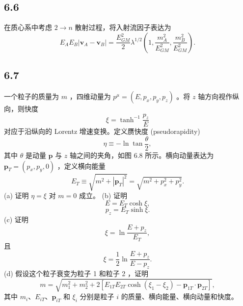 \newpage
\subsection{6.6}
在质心系中考虑 $2 \rightarrow n$ 散射过程，将入射流因子表达为
$$ E_A E_B |\mathbf{v}_A - \mathbf{v}_B| = \frac{E_{GM}^2}{2} \lambda^{1/2} \left( 1, \frac{m_A^2}{E_{GM}^2}, \frac{m_B^2}{E_{GM}^2} \right). \tag{6.420} $$

\newpage
\subsection{6.7}
一个粒子的质量为 $m$ ，四维动量为 $p^\mu = (E, p_x, p_y, p_z)$ 。将 $z$ 轴方向视作纵向，则快度
$$ \xi = \tanh^{-1} \frac{p_z}{E} \tag{6.421} $$
对应于沿纵向的 Lorentz 增速变换。定义赝快度 (pseudorapidity)
$$ \eta \equiv -\ln \tan \frac{\theta}{2}, \tag{6.422} $$
其中 $\theta$ 是动量 $\mathbf{p}$ 与 $z$ 轴之间的夹角，如图 6.8 所示。横向动量表达为 $\mathbf{p}_T = (p_x, p_y, 0)$ ，定义横向能量
$$ E_T \equiv \sqrt{m^2 + |\mathbf{p}_T|^2} = \sqrt{m^2 + p_x^2 + p_y^2}. \tag{6.423} $$
(a) 证明 $\eta = \xi$ 对 $m = 0$ 成立。
(b) 证明
$$ E = E_T \cosh \xi, $$
$$ p_z = E_T \sinh \xi. \tag{6.424} $$
(c) 证明
$$ \xi = \ln \frac{E + p_z}{E_T}, \tag{6.425} $$
且
$$ \xi = \frac{1}{2} \ln \frac{E + p_z}{E - p_z}. \tag{6.426} $$
(d) 假设这个粒子衰变为粒子 1 和粒子 2 ，证明
$$ m = \sqrt{m_1^2 + m_2^2 + 2[E_{1T}E_{2T} \cosh(\xi_1 - \xi_2) - \mathbf{p}_{1T} \cdot \mathbf{p}_{2T}]}, \tag{6.427} $$
其中 $m_i$、$E_{iT}$、$\mathbf{p}_{iT}$ 和 $\xi_i$ 分别是粒子 $i$ 的质量、横向能量、横向动量和快度。

